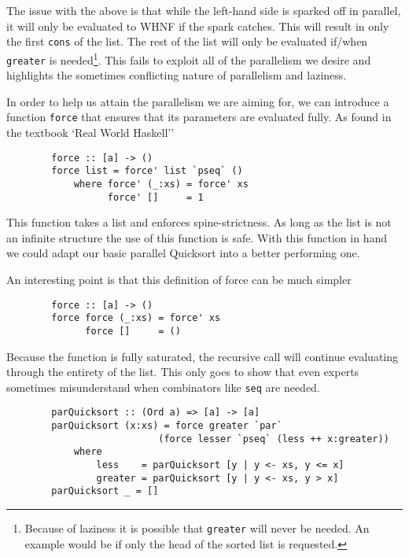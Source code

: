 The issue with the above is that while the left-hand side is sparked off in
parallel, it will only be evaluated to WHNF if the spark catches. This will
result in only the first \verb=cons= of the list. The rest of the list will
only be evaluated if/when \verb=greater= is needed\footnote{Because of
laziness it is possible that \texttt{greater} will never be needed. An
example would be if only the head of the sorted list is requested.}. This
fails to exploit all of the parallelism we desire and highlights the sometimes
conflicting nature of parallelism and laziness.

    In order to help us attain the parallelism we are aiming for, we can
introduce a function \verb=force= that ensures that its parameters are evaluated
fully. As found in the textbook `Real World Haskell'' \citep{realWorld}

\begin{verbatim}
        force :: [a] -> ()
        force list = force' list `pseq` ()
            where force' (_:xs) = force' xs
                  force' []     = 1
\end{verbatim}

This function takes a list and enforces spine-strictness. As long as the list is
not an infinite structure the use of this function is safe. With this function
in hand we could adapt our basic parallel Quicksort into a better performing one.

An interesting point is that this definition of force can be much simpler

\begin{verbatim}
        force :: [a] -> ()
        force force (_:xs) = force' xs
              force []     = ()
\end{verbatim}

Because the function is fully saturated, the recursive call will continue
evaluating through the entirety of the list. This only goes to show that even
experts sometimes misunderstand when combinators like \verb=seq= are needed.

\begin{lstlisting}
        parQuicksort :: (Ord a) => [a] -> [a]
        parQuicksort (x:xs) = force greater `par`
                           (force lesser `pseq` (less ++ x:greater))
            where
                less    = parQuicksort [y | y <- xs, y <= x]
                greater = parQuicksort [y | y <- xs, y > x]
        parQuicksort _ = []
\end{lstlisting}

